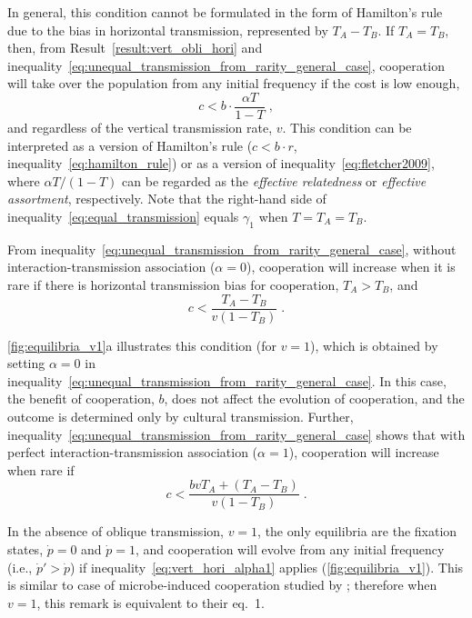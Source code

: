 \documentclass[12pt]{extarticle}
\begin{document}
In general, this condition cannot be formulated in the form of Hamilton's rule due to the bias in horizontal transmission, represented by $T_A-T_B$.
If $T_A=T_B$, then, from Result~\ref{result:vert_obli_hori} and inequality~\ref{eq:unequal_transmission_from_rarity_general_case}, cooperation will take over the population from any initial frequency if the cost is low enough,
\begin{equation}
\label{eq:equal_transmission}
c < b \cdot \frac{\alpha T}{1-T} \;,
\end{equation}
and regardless of the vertical transmission rate, $v$.
This condition can be interpreted as a version of Hamilton's rule  ($c<b\cdot r$, inequality~\ref{eq:hamilton_rule}) or as a version of inequality~\ref{eq:fletcher2009}, where $\alpha T/(1-T)$ can be regarded as the \emph{effective relatedness} or \emph{effective assortment}, respectively.
Note that the right-hand side of inequality~\ref{eq:equal_transmission} equals $\gamma_1$ when $T=T_A=T_B$.

From inequality~\ref{eq:unequal_transmission_from_rarity_general_case}, without interaction-transmission association ($\alpha=0$), cooperation will increase when it is rare if there is horizontal transmission bias for cooperation, $T_A>T_B$, and
\begin{equation}
\label{eq:vert_hori_alpha0}
c < \frac{T_A - T_B}{v(1-T_B)} \;.
\end{equation}

\autoref{fig:equilibria_v1}a illustrates this condition (for $v=1$), which is obtained by setting $\alpha=0$ in inequality~\ref{eq:unequal_transmission_from_rarity_general_case}.
In this case, the benefit of cooperation, $b$, does not affect the evolution of cooperation, and the outcome is determined only by  cultural transmission.
Further, inequality~\ref{eq:unequal_transmission_from_rarity_general_case} shows that with perfect interaction-transmission association ($\alpha=1$), cooperation will increase when rare if
\begin{equation}\label{eq:vert_hori_alpha1}
c < \frac{b v T_A + (T_A - T_B)}{v(1-T_B)} \;.
\end{equation}

In the absence of oblique transmission, $v=1$, the only equilibria are the fixation states, $\dot{p}=0$ and $\dot{p}=1$, and cooperation will evolve from any initial frequency (i.e., $\dot{p}'>\dot{p}$) if inequality~\ref{eq:vert_hori_alpha1} applies (\autoref{fig:equilibria_v1}).
This is similar to case of microbe-induced cooperation studied by \citet{lewin2017microbes}; therefore when $v=1$, this remark is equivalent to their eq.~1.
\end{document}
